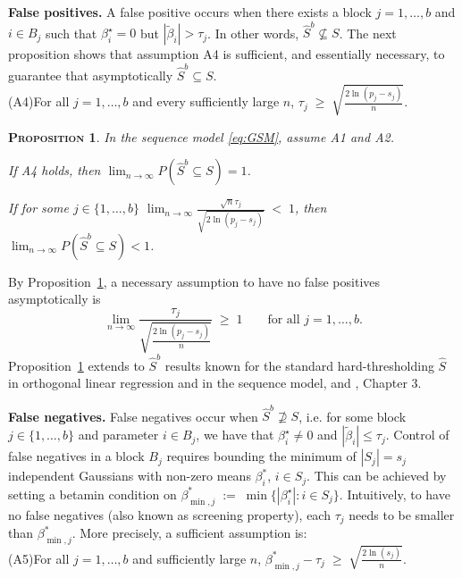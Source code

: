 \documentclass[aos]{imsart}
\theoremstyle{plain}
\newtheorem{prop}[thm]{\textsc{Proposition}}
\begin{document}
\noindent\textbf{False positives.} 
A false positive
occurs when there exists a block $j=1,\ldots,b$ and $i\in B_j$ such that $\beta^\star_i=0$
but $|\tilde \beta_i|>\tau_j$. In other words, $\hat S^{b}\not\subseteq S$. 
The next proposition shows that assumption A4 is sufficient, and essentially necessary,
to guarantee that asymptotically $\hat S^{b}\subseteq S$.\\[5pt]
(A4)\quad For all $j=1,\ldots,b$ and every sufficiently large $n$,\;\; $\tau_j \;\geq\;  \sqrt{\frac{{2\ln(p_j-s_j)}}{{n}}}$.
\\[5pt]
\begin{prop}\label{prop:suffnecIblockthresh} In the
sequence model \eqref{eq:GSM}, assume A1 and A2.
\begin{longlist}
    \item If A4 holds, then 
$\lim_{n \rightarrow \infty} P(\hat{S}^{b}\subseteq S) = 1$.\\
\item If for some $j\in\{1,\ldots,b\}$\; $
\lim_{n\to \infty} \frac{\sqrt{n}\tau_j}{\sqrt{2\ln(p_j-s_j)}} \;<\;1$,
then $\lim_{n \rightarrow \infty} P(\hat{S}^{b}\subseteq S ) <1$.
\end{longlist}
\end{prop}
By Proposition~\ref{prop:suffnecIblockthresh},
a necessary assumption to have no false positives asymptotically
is
\begin{equation}\label{cond:necIallblockthresh}
\lim_{n\to \infty} \frac{\tau_j}{\sqrt{\tfrac{2\ln(p_j-s_j)}{n}}}\;\geq\;1\qquad\mbox{for all }j=1,\ldots,b.	
\end{equation}
Proposition~\ref{prop:suffnecIblockthresh} extends to $\hat{S}^{b}$ results known for the standard hard-thresholding $\hat{S}$ in orthogonal linear regression \cite{ slope, buhlmannvandegeerbook, wainwrighthighdimbook} and in the sequence model, \cite{ariascastro} and \cite{johnstone}, Chapter 3.
\bigskip

\noindent\textbf{False negatives.} 
False negatives occur when $\hat S^{b}\not\supseteq S$, i.e. for some block $j \in \{1,\ldots,b\}$ and parameter $i\in B_j$,  we have that $\beta^\star_i\neq 0$ and $|\tilde\beta_i|\leq \tau_j$.
Control of false negatives in a block $B_j$ requires bounding the minimum of $|S_j|=s_j$ independent Gaussians with non-zero means $\beta^*_i$, $i\in S_j$. This can be achieved by setting a betamin condition
on $\beta_{\min,j}^*\;:=\;\min\{|\beta^\star_i|: i\in S_j\}$.
Intuitively, to have no false negatives (also known as screening property), each $\tau_j$ needs to be smaller than $\beta^*_{\min,j}$.
More precisely, a sufficient assumption is: \\[5pt]
(A5)\quad For all $j=1,\ldots,b$ and sufficiently large $n$, \;
	 $\beta_{\min,j}^* - \tau_j \;\geq\; \sqrt{\frac{2\ln(s_j)}{n}}$.
\end{document}
